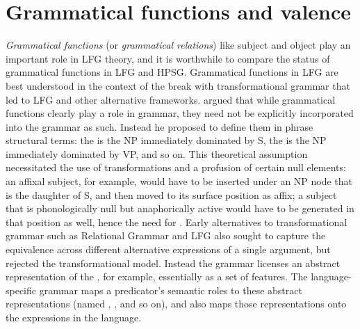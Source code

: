 \section{Grammatical functions and valence} 
\label{valence-sec}
\emph{Grammatical functions}  (or \emph{grammatical relations})  like subject and object play an important role in LFG theory,  and it is worthwhile to compare the status of grammatical functions in LFG and HPSG.  Grammatical functions in LFG are best understood in the context of the break with transformational grammar that led to LFG and other alternative frameworks.  \citet[68--74]{Chomsky65a} argued that while grammatical functions clearly play a role in  grammar, they need not be explicitly incorporated into the grammar as such.  Instead he proposed to define them in phrase structural terms: the  is the NP immediately dominated by S, the  is the NP immediately dominated by VP, and so on.   This theoretical
assumption necessitated the use of transformations and a
profusion of certain null elements: an affixal subject, for example,
would have to be inserted under an NP node that is the daughter of S, and then moved to its surface position as affix; a subject that is phonologically null but anaphorically active would have to be generated in that position as well, hence the need for .  Early alternatives to transformational grammar such as Relational Grammar \citep{Perlmutter83a-ed} and LFG also sought to  capture the equivalence
across different alternative expressions of a single argument, but
rejected the transformational model.   Instead the grammar licenses an abstract representation of the , for example, essentially as a set of features.  The language-specific grammar maps a predicator's semantic roles to these abstract representations (named , , and so on), and also maps those representations onto the expressions in the language.  

